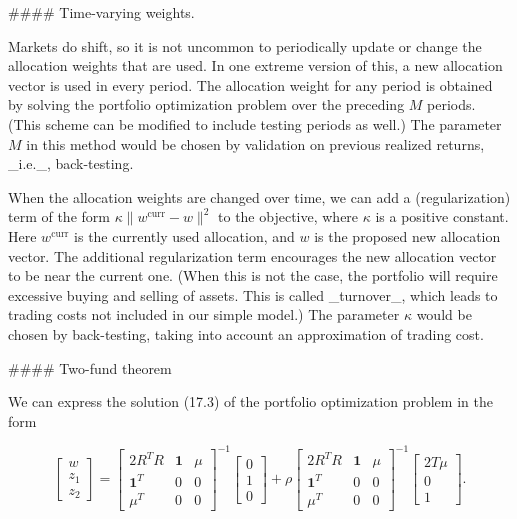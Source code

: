 

#### Time-varying weights.

Markets do shift, so it is not uncommon to periodically update or change the allocation weights that are used. In one extreme version of this, a new allocation vector is used in every period. The allocation weight for any period is obtained by solving the portfolio optimization problem over the preceding \(M\) periods. (This scheme can be modified to include testing periods as well.) The parameter \(M\) in this method would be chosen by validation on previous realized returns, _i.e._, back-testing.

When the allocation weights are changed over time, we can add a (regularization) term of the form \(\kappa\|w^{\mathrm{curr}}-w\|^{2}\) to the objective, where \(\kappa\) is a positive constant. Here \(w^{\mathrm{curr}}\) is the currently used allocation, and \(w\) is the proposed new allocation vector. The additional regularization term encourages the new allocation vector to be near the current one. (When this is not the case, the portfolio will require excessive buying and selling of assets. This is called _turnover_, which leads to trading costs not included in our simple model.) The parameter \(\kappa\) would be chosen by back-testing, taking into account an approximation of trading cost.

#### Two-fund theorem

We can express the solution (17.3) of the portfolio optimization problem in the form

\[\left[\begin{array}{c}w\\ z_{1}\\ z_{2}\end{array}\right]=\left[\begin{array}{ccc}2R^{T}R&\mathbf{1}&\mu\\ \mathbf{1}^{T}&0&0\\ \mu^{T}&0&0\end{array}\right]^{-1}\left[\begin{array}{ccc}0\\ 1\\ 0\end{array}\right]+\rho\left[\begin{array}{ccc}2R^{T}R&\mathbf{1}&\mu\\ \mathbf{1}^{T}&0&0\\ \mu^{T}&0&0\end{array}\right]^{-1}\left[\begin{array}{c}2T\mu\\ 0\\ 1\end{array}\right].\]

